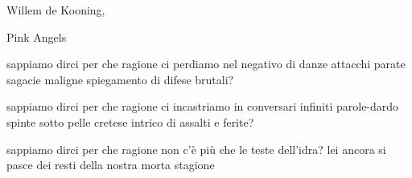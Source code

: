 \begin{volumetitlepage}

	\bigskip\bigskip\bigskip

	\bigskip\bigskip\bigskip
\end{volumetitlepage}


\begin{artItem}
	Willem de Kooning, \begin{otherlanguage}{english}%
		Pink Angels%
	\end{otherlanguage}
\end{artItem}

\begin{poem}
	\begin{stanza}
		sappiamo dirci per che ragione\verseline
		ci perdiamo nel negativo di danze\verseline
		attacchi parate sagacie maligne\verseline
		spiegamento di difese brutali?
	\end{stanza}

	\begin{stanza}
		sappiamo dirci per che ragione\verseline
		ci incastriamo in conversari infiniti\verseline
		parole-dardo spinte sotto pelle\verseline
		cretese intrico di assalti e ferite?
	\end{stanza}

	\begin{stanza}
		sappiamo dirci per che ragione\verseline
		non c'è più che le teste dell'idra?\verseline
		lei ancora si pasce dei resti\verseline
		della nostra morta stagione
	\end{stanza}
\end{poem}

